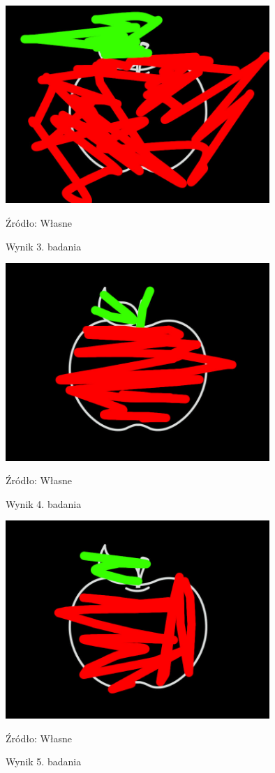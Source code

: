 \documentclass{article}
\begin{document}
\begin{figure}[bp!]
	\centering
	\includegraphics[width=10cm]{wyniki/3}
	\caption{Wynik 3. badania}
	Źródło: Własne
\end{figure}

\begin{figure}[bp!]
	\centering
	\includegraphics[width=10cm]{wyniki/4}
	\caption{Wynik 4. badania}
	Źródło: Własne
\end{figure}

\begin{figure}[bp!]
	\centering
	\includegraphics[width=10cm]{wyniki/5}
	\caption{Wynik 5. badania}
	Źródło: Własne
\end{figure}
\end{document}
